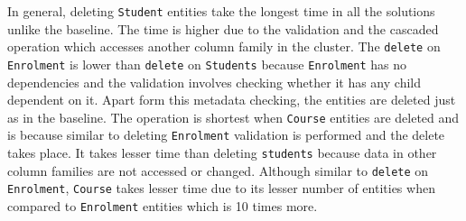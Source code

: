 In general, deleting \texttt{Student} entities take the longest time in all the
solutions unlike the baseline. The time is higher due to the validation and the
cascaded operation which accesses another column family in the cluster. The
\texttt{delete} on \texttt{Enrolment} is lower than \texttt{delete} on
\texttt{Students} because \texttt{Enrolment} has no dependencies and the
validation involves checking whether it has any child dependent on it. Apart
form this metadata checking, the entities are deleted just as in the baseline.
The operation is shortest when \texttt{Course} entities are deleted and is
because similar to deleting \texttt{Enrolment} validation is performed and the
delete takes place. It takes lesser time than deleting \texttt{students} because
data in other column families are not accessed or changed. Although similar to
\texttt{delete} on \texttt{Enrolment}, \texttt{Course} takes lesser time due to
its lesser number of entities when compared to \texttt{Enrolment} entities which
is 10 times more.



\newcommand{\Width}{.5\textwidth}
% 	

